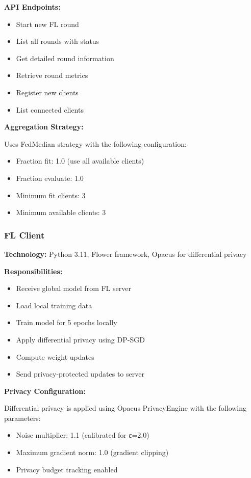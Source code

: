 \documentclass[12pt,a4paper]{article}
\begin{document}
\textbf{API Endpoints:}
\begin{itemize}[leftmargin=1cm,itemsep=0pt]
    \item Start new FL round
    \item List all rounds with status
    \item Get detailed round information
    \item Retrieve round metrics
    \item Register new clients
    \item List connected clients
\end{itemize}

\textbf{Aggregation Strategy:}

Uses FedMedian strategy with the following configuration:
\begin{itemize}[leftmargin=1cm,itemsep=0pt]
    \item Fraction fit: 1.0 (use all available clients)
    \item Fraction evaluate: 1.0
    \item Minimum fit clients: 3
    \item Minimum available clients: 3
\end{itemize}

\subsubsection{FL Client}

\textbf{Technology:} Python 3.11, Flower framework, Opacus for differential privacy

\textbf{Responsibilities:}
\begin{itemize}[leftmargin=1cm,itemsep=0pt]
    \item Receive global model from FL server
    \item Load local training data
    \item Train model for 5 epochs locally
    \item Apply differential privacy using DP-SGD
    \item Compute weight updates
    \item Send privacy-protected updates to server
\end{itemize}

\textbf{Privacy Configuration:}

Differential privacy is applied using Opacus PrivacyEngine with the following parameters:
\begin{itemize}[leftmargin=1cm,itemsep=0pt]
    \item Noise multiplier: 1.1 (calibrated for ε=2.0)
    \item Maximum gradient norm: 1.0 (gradient clipping)
    \item Privacy budget tracking enabled
\end{itemize}
\end{document}
